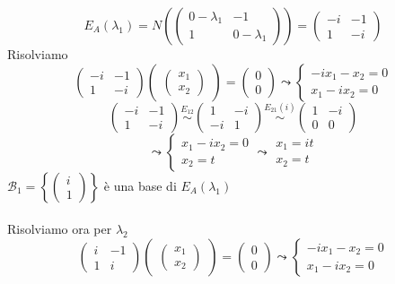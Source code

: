 \documentclass[12pt]{article}
\begin{document}
\[E_A(\lambda_1) = N\left(\begin{pmatrix}
    0 - \lambda_1 & -1\\
    1 & 0 -\lambda_1
\end{pmatrix}\right) = \begin{pmatrix}
    -i & -1\\
    1 & -i
\end{pmatrix}\]
Risolviamo
\[\begin{pmatrix}
    -i & -1\\
    1 & -i
\end{pmatrix}\begin{pmatrix}
    \begin{pmatrix}
        x_1\\
        x_2
    \end{pmatrix}
\end{pmatrix} = \begin{pmatrix}
    0\\
    0
\end{pmatrix} \leadsto \begin{cases}
    -ix_1 - x_2 = 0\\
    x_1 - ix_2 = 0
\end{cases}\]
\[\begin{pmatrix}
    -i & -1\\
    1 & -i
\end{pmatrix} \stackrel{E_{12}}{\sim} \begin{pmatrix}
    1 & -i\\
    -i & 1
\end{pmatrix} \stackrel{E_{21}(i)}{\sim} \begin{pmatrix}
    1 & -i\\
    0 & 0
\end{pmatrix}\]
\[\leadsto \begin{cases}
    x_1 - ix_2 = 0\\
    x_2 = t
\end{cases} \leadsto \begin{matrix}
    x_1 = it\\
    x_2 = t
\end{matrix}\]
$\mathcal{B}_1 = \left\{\begin{pmatrix}
    i\\
    1
\end{pmatrix}\right\}$ è una base di $E_A(\lambda_1)$\\\\
Risolviamo ora per $\lambda_2$
\[\begin{pmatrix}
    i & -1\\
    1 & i
\end{pmatrix}\begin{pmatrix}
    \begin{pmatrix}
        x_1\\
        x_2
    \end{pmatrix}
\end{pmatrix} = \begin{pmatrix}
    0\\
    0
\end{pmatrix} \leadsto \begin{cases}
    -ix_1 - x_2 = 0\\
    x_1 - ix_2 = 0
\end{cases}\]
\end{document}
